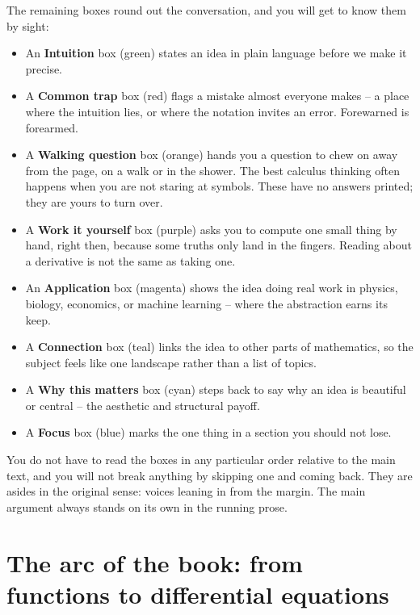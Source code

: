 The remaining boxes round out the conversation, and you will get to know them by sight:

\begin{itemize}
  \item An \textbf{Intuition} box (green) states an idea in plain language before we make it precise.
  \item A \textbf{Common trap} box (red) flags a mistake almost everyone makes -- a place where the
  intuition lies, or where the notation invites an error. Forewarned is forearmed.
  \item A \textbf{Walking question} box (orange) hands you a question to chew on away from the page,
  on a walk or in the shower. The best calculus thinking often happens when you are not staring at
  symbols. These have no answers printed; they are yours to turn over.
  \item A \textbf{Work it yourself} box (purple) asks you to compute one small thing by hand, right
  then, because some truths only land in the fingers. Reading about a derivative is not the same as
  taking one.
  \item An \textbf{Application} box (magenta) shows the idea doing real work in physics, biology,
  economics, or machine learning -- where the abstraction earns its keep.
  \item A \textbf{Connection} box (teal) links the idea to other parts of mathematics, so the
  subject feels like one landscape rather than a list of topics.
  \item A \textbf{Why this matters} box (cyan) steps back to say why an idea is beautiful or
  central -- the aesthetic and structural payoff.
  \item A \textbf{Focus} box (blue) marks the one thing in a section you should not lose.
\end{itemize}

\begin{marginnotebox}
You do not have to read the boxes in any particular order relative to the main text, and you will
not break anything by skipping one and coming back. They are asides in the original sense: voices
leaning in from the margin. The main argument always stands on its own in the running prose.
\end{marginnotebox}

\section*{The arc of the book: from functions to differential equations}

